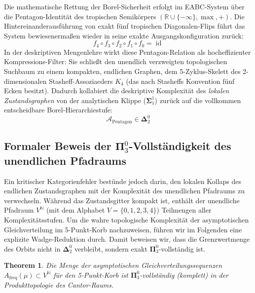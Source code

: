 \documentclass[11pt,a4paper]{article}
\newtheorem{theorem}{Theorem}[section]
\numberwithin{equation}{section}
\begin{document}
	Die mathematische Rettung der Borel-Sicherheit erfolgt im EABC-System über die Pentagon-Identität des tropischen Semikörpers $(\mathbb{R} \cup \{-\infty\}, \max, +)$. Die Hintereinanderausführung von exakt fünf tropischen Diagonalen-Flips führt das System bewiesenermaßen wieder in seine exakte Ausgangskonfiguration zurück:
	\begin{equation}
		f_4 \circ f_3 \circ f_2 \circ f_1 \circ f_0 = \operatorname{id}
	\end{equation}
	In der deskriptiven Mengenlehre wirkt diese Pentagon-Relation als hocheffizienter Kompressions-Filter: Sie schließt den unendlich verzweigten topologischen Suchbaum zu einem kompakten, endlichen Graphen, dem 5-Zyklus-Skelett des 2-dimensionalen Stasheff-Assoziaeders $K_4$ (das nach Stasheffs Konvention fünf Ecken besitzt). Dadurch kollabiert die deskriptive Komplexität des \textit{lokalen Zustandsgraphen} von der analytischen Klippe ($\mathbf{\Sigma}^1_1$) zurück auf die vollkommen entscheidbare Borel-Hierarchiestufe:
	\begin{equation}
		\mathcal{A}_{\text{Pentagon}} \in \mathbf{\Delta}^0_2
	\end{equation}
	
	\subsection{Formaler Beweis der $\mathbf{\Pi}^0_3$-Vollständigkeit des unendlichen Pfadraums}
	
	Ein kritischer Kategorienfehler bestünde jedoch darin, den lokalen Kollaps des endlichen Zustandsgraphen mit der Komplexität des unendlichen Pfadraums zu verwechseln. Während das Zustandsgitter kompakt ist, enthält der unendliche Pfadraum $V^\mathbb{N}$ (mit dem Alphabet $V = \{0, 1, 2, 3, 4\}$) Teilmengen aller Komplexitätsstufen. Um die wahre topologische Komplexität der asymptotischen Gleichverteilung im 5-Punkt-Korb nachzuweisen, führen wir im Folgenden eine explizite Wadge-Reduktion durch. Damit beweisen wir, dass die Grenzwertmenge des Orbits nicht in $\mathbf{\Delta}^0_2$ verbleibt, sondern exakt $\mathbf{\Pi}^0_3$-vollständig ist.
	
	\begin{theorem}
		Die Menge der asymptotischen Gleichverteilungssequenzen $A_{\mathrm{freq}}(\mu) \subset V^\mathbb{N}$ für den 5-Punkt-Korb ist $\mathbf{\Pi}^0_3$-vollständig (komplett) in der Produkttopologie des Cantor-Raums.
	\end{theorem}
	
\end{document}
